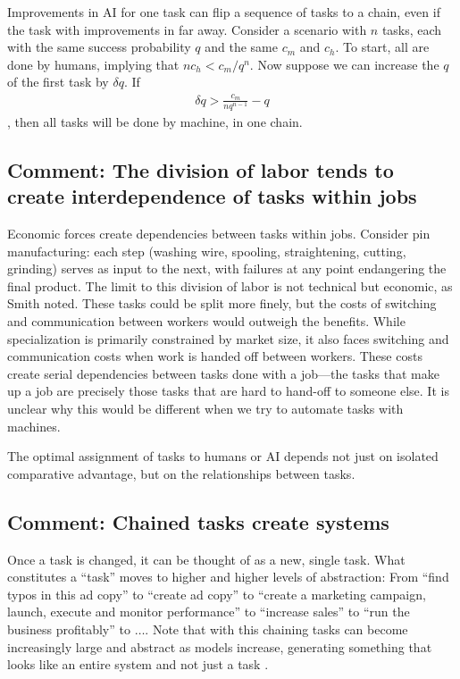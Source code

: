 \documentclass{article}
\begin{document}
Improvements in AI for one task can flip a sequence of tasks to a chain, even if the task with improvements in far away. 
Consider a scenario with $n$ tasks, each with the same success probability $q$ and the same $c_m$ and $c_h$.
To start, all are done by humans, implying that $n c_h < c_m / q^n$.
Now suppose we can increase the $q$ of the first task by $\delta q$. 
If 
\begin{align}
  \delta q > \frac{c_m}{n q^{n-1}} - q
\end{align}, 
then all tasks will be done by machine, in one chain.

\begin{tcolorbox}
  \subsection{Comment: The division of labor tends to create interdependence of tasks within jobs}
  Economic forces create dependencies between tasks within jobs. 
  Consider pin manufacturing: each step (washing wire, spooling, straightening, cutting, grinding) serves as input to the next, with failures at any point endangering the final product. 
  The limit to this division of labor is not technical but economic, as Smith noted.
  These tasks could be split more finely, but the costs of switching and communication between workers would outweigh the benefits.
  While specialization is primarily constrained by market size, it also faces switching and communication costs when work is handed off between workers. 
  These costs create serial dependencies between tasks done with a job---the tasks that make up a job are precisely those tasks that are hard to hand-off to someone else. 
  It is unclear why this would be different when we try to automate tasks with machines.
\end{tcolorbox}

The optimal assignment of tasks to humans or AI depends not just on isolated comparative advantage, but on the relationships between tasks.

\begin{tcolorbox}
\subsection{Comment: Chained tasks create systems}
Once a task is changed, it can be thought of as a new, single task.
What constitutes a ``task'' moves to higher and higher levels of abstraction: 
From ``find typos in this ad copy'' to ``create ad copy'' to ``create a marketing campaign, launch, execute and monitor performance'' to ``increase sales'' to ``run the business profitably'' to $\ldots$.  
Note that with this chaining tasks can become increasingly large and abstract as models increase, generating something that looks like an entire system and not just a task \cite{bresnahan2020artificial}.
\end{tcolorbox}
\end{document}
